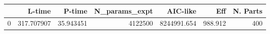 \begin{tabular}{lrrrrrr}
\toprule
{} &      L-time &     P-time &  N\_params\_expt &     AIC-like &      Eff &  N. Parts \\
\midrule
0 &  317.707907 &  35.943451 &        4122500 &  8244991.654 &  988.912 &       400 \\
\bottomrule
\end{tabular}

